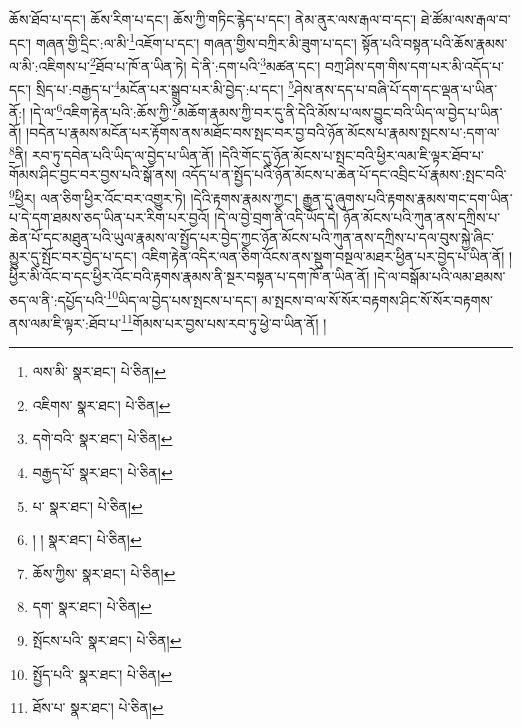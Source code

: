 ཆོས་ཐོབ་པ་དང་། ཆོས་རིག་པ་དང་། ཆོས་ཀྱི་གཏིང་རྙེད་པ་དང་། ནེམ་ནུར་ལས་རྒལ་བ་དང་། ཐེ་ཚོམ་ལས་རྒལ་བ་དང་། གཞན་གྱི་དྲིང་:ལ་མི་\footnote{ལས་མི་  སྣར་ཐང་།  པེ་ཅིན། }འཇོག་པ་དང་། གཞན་གྱིས་བཀྲིར་མི་ཟུག་པ་དང་། སྟོན་པའི་བསྟན་པའི་ཆོས་རྣམས་ལ་མི་:འཇིགས་པ་\footnote{འཇིགས་  སྣར་ཐང་།  པེ་ཅིན། }ཐོབ་པ་ཁོ་ན་ཡིན་ཏེ། དེ་ནི་:དག་པའི་\footnote{དགེ་བའི་  སྣར་ཐང་།  པེ་ཅིན། }མཚན་དང་། བཀྲ་ཤིས་དག་གིས་དག་པར་མི་འདོད་པ་དང་། སྲིད་པ་:བརྒྱད་པ་\footnote{བརྒྱད་པོ་  སྣར་ཐང་།  པེ་ཅིན། }མངོན་པར་སྒྲུབ་པར་མི་བྱེད་:པ་དང་། \footnote{པ་  སྣར་ཐང་།  པེ་ཅིན། }ཤེས་ནས་དད་པ་བཞི་པོ་དག་དང་ལྡན་པ་ཡིན་ནོ:། །དེ་ལ་\footnote{། །  སྣར་ཐང་།  པེ་ཅིན། }འཇིག་རྟེན་པའི་:ཆོས་ཀྱི་\footnote{ཆོས་ཀྱིས་  སྣར་ཐང་།  པེ་ཅིན། }མཆོག་རྣམས་ཀྱི་བར་དུ་ནི་དེའི་མོས་པ་ལས་བྱུང་བའི་ཡིད་ལ་བྱེད་པ་ཡིན་ནོ། །བདེན་པ་རྣམས་མངོན་པར་རྟོགས་ནས་མཐོང་བས་སྤང་བར་བྱ་བའི་ཉོན་མོངས་པ་རྣམས་སྤངས་པ་:དག་ལ་\footnote{དག་  སྣར་ཐང་།  པེ་ཅིན། }ནི། རབ་ཏུ་དབེན་པའི་ཡིད་ལ་བྱེད་པ་ཡིན་ནོ། །དེའི་གོང་དུ་ཉོན་མོངས་པ་སྤང་བའི་ཕྱིར་ལམ་ཇི་ལྟར་ཐོབ་པ་གོམས་ཤིང་བྱང་བར་བྱས་པའི་སྒོ་ནས། འདོད་པ་ན་སྤྱོད་པའི་ཉོན་མོངས་པ་ཆེན་པོ་དང་འབྲིང་པོ་རྣམས་:སྤང་བའི་\footnote{སྤོངས་པའི་  སྣར་ཐང་།  པེ་ཅིན། }ཕྱིར། ལན་ཅིག་ཕྱིར་འོང་བར་འགྱུར་ཏེ། །དེའི་རྟགས་རྣམས་ཀྱང་། རྒྱུན་དུ་ཞུགས་པའི་རྟགས་རྣམས་གང་དག་ཡིན་པ་དེ་དག་ཐམས་ཅད་ཡིན་པར་རིག་པར་བྱའོ། །དེ་ལ་བྱེ་བྲག་ནི་འདི་ཡོད་དེ། ཉོན་མོངས་པའི་ཀུན་ནས་དཀྲིས་པ་ཆེན་པོ་དང་མཐུན་པའི་ཡུལ་རྣམས་ལ་སྤྱོད་པར་བྱེད་ཀྱང་ཉོན་མོངས་པའི་ཀུན་ནས་དཀྲིས་པ་དལ་བུས་སྐྱེ་ཞིང་མྱུར་དུ་སྤོང་བར་བྱེད་པ་དང་། འཇིག་རྟེན་འདིར་ལན་ཅིག་འོངས་ནས་སྡུག་བསྔལ་མཐར་ཕྱིན་པར་བྱེད་པ་ཡིན་ནོ། །ཕྱིར་མི་འོང་བ་དང་ཕྱིར་འོང་བའི་རྟགས་རྣམས་ནི་སྔར་བསྟན་པ་དག་ཁོ་ན་ཡིན་ནོ། །དེ་ལ་བསྒོམ་པའི་ལམ་ཐམས་ཅད་ལ་ནི་:དཔྱོད་པའི་\footnote{སྤྱོད་པའི་  སྣར་ཐང་།  པེ་ཅིན། }ཡིད་ལ་བྱེད་པས་སྤངས་པ་དང་། མ་སྤངས་བ་ལ་སོ་སོར་བརྟགས་ཤིང་སོ་སོར་བརྟགས་ནས་ལམ་ཇི་ལྟར་:ཐོབ་པ་\footnote{ཐོས་པ་  སྣར་ཐང་།  པེ་ཅིན། }གོམས་པར་བྱས་པས་རབ་ཏུ་ཕྱེ་བ་ཡིན་ནོ། །
